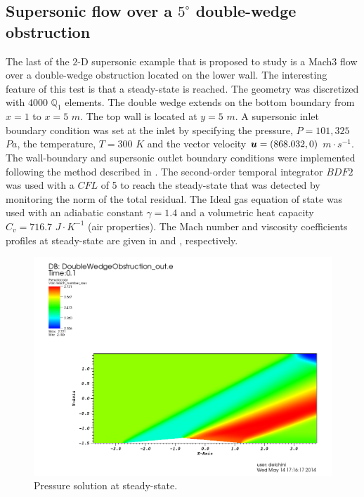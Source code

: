 \subsection{Supersonic flow over a $5^\circ$ double-wedge obstruction} \label{sec:double_wedge}
The last of the $2$-D supersonic example that is proposed to study is a Mach$3$ flow over a double-wedge obstruction located on the lower wall. The interesting feature of this test is that a steady-state is reached. The geometry was discretized with $4000$ $\mathbb Q_1$ elements. The double wedge extends on the bottom boundary from $x=1$ to $x=5$  $m$. The top wall is located at $y=5$ $m$. A supersonic inlet boundary condition was set at the inlet by specifying the pressure, $P=101,325$ $Pa$, the temperature, $T=300$ $K$ and the vector velocity $\boldsymbol u = (868.032, 0)$ $m \cdot s^{-1}$. The wall-boundary and supersonic outlet boundary conditions were implemented following the method described in . The second-order temporal integrator $BDF2$ was used with a $CFL$ of 5 to reach the steady-state that was detected by monitoring the norm of the total residual. The Ideal gas equation of state was used with an adiabatic constant $\gamma = 1.4$ and a volumetric heat capacity $C_v = 716.7$ $J \cdot K^{-1}$ (air properties). The Mach number and viscosity coefficients profiles at steady-state are given in  and , respectively. 
        \begin{figure}[H]%
                \centering
                \includegraphics[scale=.50]{figures/DWOMachNumberStt.png}
                \caption{Pressure solution at steady-state.}
                \label{fig:2d_dbwd_stt}
        \end{figure}%
